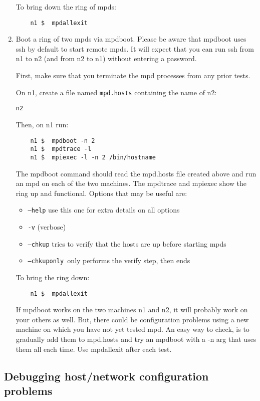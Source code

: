 \documentclass[dvipdfm,11pt]{article}
\begin{document}
\begin{enumerate}
To bring down the ring of mpds:
\begin{verbatim}
    n1 $  mpdallexit
\end{verbatim}


\item Boot a ring of two mpds via mpdboot.
Please be aware that mpdboot uses ssh by default to start remote mpds.
It will expect that you can run ssh from n1 to n2 (and from n2 to n1)
without entering a password.

First, make sure that you terminate the mpd processes from any prior
tests.

On n1, create a file named \texttt{mpd.hosts} containing the name of n2:
\begin{verbatim}
n2
\end{verbatim}

Then, on n1 run:
\begin{verbatim}
    n1 $  mpdboot -n 2
    n1 $  mpdtrace -l
    n1 $  mpiexec -l -n 2 /bin/hostname
\end{verbatim}
The mpdboot command should read the mpd.hosts file created above and
run an mpd on each of the two machines.  The mpdtrace and mpiexec show
the ring up and functional.
Options that may be useful are:
\begin{itemize}
    \item \texttt{--help} use this one for extra details on all options
    \item \texttt{-v} (verbose)
    \item \texttt{--chkup} tries to verify that the hosts are up before starting mpds
    \item \texttt{--chkuponly }only performs the verify step, then ends
\end{itemize}

To bring the ring down:
\begin{verbatim}
    n1 $  mpdallexit
\end{verbatim}

If mpdboot works on the two machines n1 and n2, it will probably work on
your others as well.  But, there could be configuration problems using a
new machine on which you have not yet tested mpd.  An easy way to check,
is to gradually add them to mpd.hosts and try an mpdboot with a -n arg
that uses them all each time.  Use mpdallexit after each test.

\end{enumerate}


\subsection{Debugging host/network configuration problems}
\label{sec:debug-host-net-config}
\end{document}
